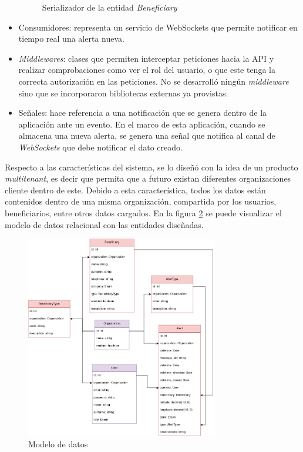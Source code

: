 \begin{itemize}
\begin{figure}[H]
	\caption{Serializador de la entidad \textit{Beneficiary}}
	\label{backend:view1}
    \end{figure}
    \item Consumidores: representa un servicio de WebSockets que permite notificar en tiempo real una alerta nueva.
    \item \textit{Middlewares}: clases que permiten interceptar peticiones hacia la API\citep{DJANGO:10} y realizar comprobaciones como ver el rol del usuario, o que este tenga la correcta autorización en las peticiones. No se desarrolló ningún \textit{middleware} sino que se incorporaron bibliotecas externas ya provistas.
    \item Señales: hace referencia a una notificación que se genera dentro de la aplicación ante un evento\citep{DJANGO:11}. En el marco de esta aplicación, cuando se almacena una nueva alerta, se genera una señal que notifica al canal de \textit{WebSockets} que debe notificar el dato creado.
\end{itemize}

Respecto a las características del sistema, se lo diseñó con la idea de un producto \textit{multitenant}, es decir que permita que a futuro existan diferentes organizaciones cliente dentro de este\citep{DJANGO:12}. Debido a esta característica, todos los datos están contenidos dentro de una misma organización, compartida por los usuarios, beneficiarios, entre otros datos cargados. En la figura \ref{backend:modelo} se puede visualizar el modelo de datos relacional con las entidades diseñadas.

\begin{figure}[H]
	\centering
	\includegraphics[width=0.75\textwidth]{./Figures/backend-modelos.png}
	\caption{Modelo de datos}
	\label{backend:modelo}
\end{figure}


